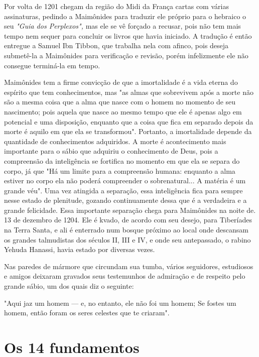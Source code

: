 \begin{itemize}
\begin{enumrate}
Por volta de 1201 chegam da região do Midi da França cartas com várias
assinaturas, pedindo a Maimônides para traduzir ele próprio para o
he­braico o seu \emph{"Guia dos Perplexos",} mas ele se vê forçado a
recusar, pois não tem mais tempo nem sequer para concluir os livros que
havia iniciado. A tradu­ção é então entregue a Samuel Ibn Tibbon, que
trabalha nela com afinco, pois deseja submetê-la a Maimônides para
verificação e revisão, porém infelizmente ele não consegue terminá-la em
tempo.

Maimônides tem a firme convicção de que a imortalidade é a vida eterna
do espírito que tem conhecimentos, mas "as almas que sobrevivem após a
morte não são a mesma coisa que a alma que nasce com o homem no mo­mento
de seu nascimento; pois aquela que nasce ao mesmo tempo que ele é apenas
algo em potencial e uma disposição, enquanto que a coisa que fica em
separado depois da morte é aquilo em que ela se transformou". Portanto,
a imor­talidade depende da quantidade de conhecimentos adquiridos. A
morte é acon­tecimento mais importante para o sábio que adquiriu o
conhecimento de Deus, pois a compreensão da inteligência se fortifica no
momento em que ela se sepa­ra do corpo, já que "Há um limite para a
compreensão humana: enquanto a alma estiver no corpo ela não poderá
compreender o sobrenatural... A matéria é um grande véu". Uma vez
atingida a separação, essa inteligência fica para sem­pre nesse estado
de plenitude, gozando continuamente dessa que é a verdadei­ra e a grande
felicidade.
Essa importante separação chega para Maimônides na noite
de. 13 de dezembro de 1204. Ele é kvado, de acordo com
seu desejo, para Tiberíades na Terra Santa, e ali é enterrado num bosque
próximo ao local onde descan­sam os grandes talmudistas dos séculos II,
III e IV, e onde seu antepassado, o rabino Yehuda Hanassi, havia estado
por diversas vezes.

Nas paredes de mármore que circundam sua tumba, vários seguido­res,
estudiosos e amigos deixaram gravados seus testemunhos de admiração e de
respeito pelo grande sábio, um dos quais diz o seguinte:

"Aqui jaz um homem --- e, no entanto, ele não foi um homem; Se fostes um
homem, então foram os seres celestes que te criaram".



\parte{\title}

\section{Os 14 fundamentos}


\end{enumrate}
\end{itemize}

